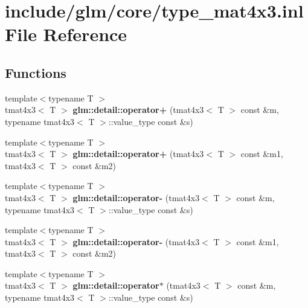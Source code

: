 \hypertarget{type__mat4x3_8inl}{\section{include/glm/core/type\-\_\-mat4x3.inl \-File \-Reference}
\label{type__mat4x3_8inl}
}
\subsection*{\-Functions}
\begin{DoxyCompactItemize}
\item 
\hypertarget{namespaceglm_1_1detail_a2e17a7427e529fb0f7b660198a7992ba}{{\footnotesize template$<$typename T $>$ }\\tmat4x3$<$ \-T $>$ {\bfseries glm\-::detail\-::operator+} (tmat4x3$<$ \-T $>$ const \&m, typename tmat4x3$<$ \-T $>$\-::value\-\_\-type const \&s)}\label{namespaceglm_1_1detail_a2e17a7427e529fb0f7b660198a7992ba}

\item 
\hypertarget{namespaceglm_1_1detail_a99110638301deadee42ecb54bce11d94}{{\footnotesize template$<$typename T $>$ }\\tmat4x3$<$ \-T $>$ {\bfseries glm\-::detail\-::operator+} (tmat4x3$<$ \-T $>$ const \&m1, tmat4x3$<$ \-T $>$ const \&m2)}\label{namespaceglm_1_1detail_a99110638301deadee42ecb54bce11d94}

\item 
\hypertarget{namespaceglm_1_1detail_a9ed742cdf158d4c3efcfdae68be424a8}{{\footnotesize template$<$typename T $>$ }\\tmat4x3$<$ \-T $>$ {\bfseries glm\-::detail\-::operator-\/} (tmat4x3$<$ \-T $>$ const \&m, typename tmat4x3$<$ \-T $>$\-::value\-\_\-type const \&s)}\label{namespaceglm_1_1detail_a9ed742cdf158d4c3efcfdae68be424a8}

\item 
\hypertarget{namespaceglm_1_1detail_a3423c8de8554a3688e89ae69df42b200}{{\footnotesize template$<$typename T $>$ }\\tmat4x3$<$ \-T $>$ {\bfseries glm\-::detail\-::operator-\/} (tmat4x3$<$ \-T $>$ const \&m1, tmat4x3$<$ \-T $>$ const \&m2)}\label{namespaceglm_1_1detail_a3423c8de8554a3688e89ae69df42b200}

\item 
\hypertarget{namespaceglm_1_1detail_a93433fb5fa924faf0c04b9e88e6a3af9}{{\footnotesize template$<$typename T $>$ }\\tmat4x3$<$ \-T $>$ {\bfseries glm\-::detail\-::operator$\ast$} (tmat4x3$<$ \-T $>$ const \&m, typename tmat4x3$<$ \-T $>$\-::value\-\_\-type const \&s)}\label{namespaceglm_1_1detail_a93433fb5fa924faf0c04b9e88e6a3af9}


\end{DoxyCompactItemize}
